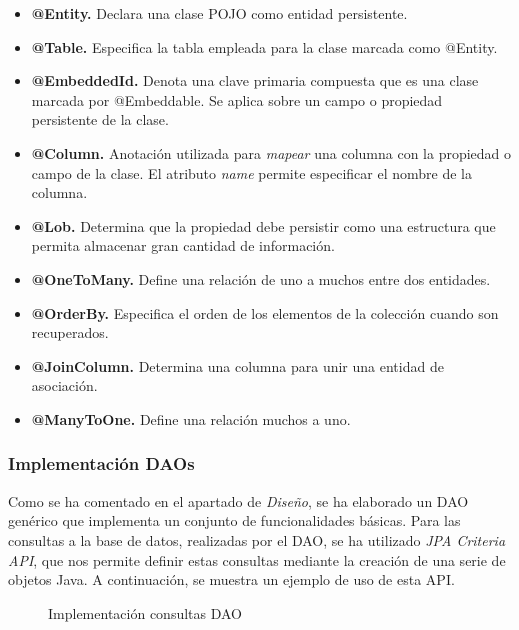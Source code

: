 \begin{itemize}
	\item \textbf{@Entity. }Declara una clase POJO como entidad persistente. 
	\item \textbf{@Table. }Especifica la tabla empleada para la clase marcada como @Entity. 
	\item \textbf{@EmbeddedId. }Denota una clave primaria compuesta que es una clase marcada por @Embeddable. Se aplica sobre un campo o propiedad persistente de la clase.
	\item \textbf{@Column. }Anotación utilizada para \textit{mapear} una columna con la propiedad o campo de la clase. El atributo \textit{name} permite especificar el nombre de la columna.
	\item \textbf{@Lob. } Determina que la propiedad debe persistir como una estructura que permita almacenar gran cantidad de información.
	\item \textbf{@OneToMany. }Define una relación de uno a muchos entre dos entidades. 
	\item \textbf{@OrderBy. }Especifica el orden de los elementos de la colección cuando son recuperados.
	\item \textbf{@JoinColumn. }Determina una columna para unir una entidad de asociación.
	\item \textbf{@ManyToOne. }Define una relación muchos a uno.
\end{itemize}



\subsubsection*{Implementación DAOs}
Como se ha comentado en el apartado de \textit{Diseño}, se ha elaborado un DAO genérico que implementa un conjunto de funcionalidades básicas. Para las consultas a la base de datos, realizadas por el DAO, se ha utilizado \textit{JPA Criteria API}, que nos permite definir estas consultas mediante la creación de una serie de objetos Java. A continuación, se muestra un ejemplo de uso de esta API.

\begin{figure}[H]
\centering
{}
\caption{Implementación consultas DAO}
\end{figure}

